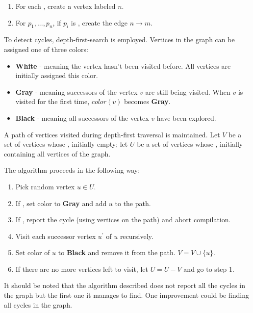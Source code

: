 \begin{enumerate}
\item
For each \NtDefinitionN[n], create a vertex labeled $n$.
\item
For $p_1, ..., p_n$, if $p_i$ is \NonTerminal[m][m\_?], create the edge $n\rightarrow m$.
\end{enumerate}


To detect cycles, depth-first-search is employed. Vertices in the graph can be assigned one of three colors:

\begin{itemize}
\item

\textbf{White} - meaning the vertex hasn't been visited before. All vertices are initially assigned this color.

\item
\textbf{Gray} - meaning successors of the vertex $v$ are still being visited. When $v$ is visited for the first time, $color(v)$ becomes \textbf{Gray}.
\item
\textbf{Black} - meaning all successors of the vertex $v$ have been explored.
\end{itemize}

A path of vertices visited during depth-first traversal is maintained.  Let $V$ be a set of vertices whose , initially empty; let $U$ be a set of vertices whose , initially containing all vertices of the graph.

The algorithm proceeds in the following way:

\begin{enumerate}
\item Pick random vertex $u \in U$.
\item If , set color to \textbf{Gray} and add $u$ to the path.
\item If , report the cycle (using vertices on the path) and abort compilation.
\item Visit each successor vertex $u^{\prime}$ of $u$ recursively.
\item Set color of $u$ to \textbf{Black} and remove it from the path. $V = V \cup \{u\}$.
\item If there are no more vertices left to visit, let $U = U-V$ and go to step 1.
\end{enumerate}

It should be noted that the algorithm described does not report all the cycles in the graph but the first one it manages to find. One improvement could be finding all cycles in the graph.

